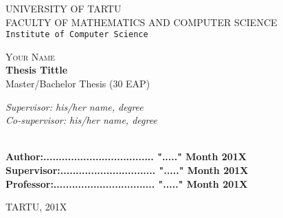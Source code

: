 \begin{titlepage}

\begin{center}



\textsc{UNIVERSITY OF TARTU}\\

\textsc{FACULTY OF MATHEMATICS AND COMPUTER SCIENCE}\\

\texttt{Institute of Computer Science}\\

\vspace{6 cm}


\textsc{ \large Your Name}\\[0.5cm]
{ \Huge \bfseries Thesis Tittle}\\[0.5cm]
{\large Master/Bachelor Thesis (30 EAP)}\\[3cm]



\begin{minipage}{0.8\textwidth}
\begin{flushright} \large
\emph{Supervisor: his/her name, degree}  \\	  %
\emph{Co-supervisor: his/her name, degree}  %
\end{flushright}
\end{minipage}

\textbf{}\\[1.0cm]

\textbf{Author:.................................... "....." Month   201X}\\[0.5cm]

\textbf{Supervisor:............................... "....." Month   201X}\\[0.5cm]

\textbf{Professor:................................. "....." Month   201X}\\[0.5cm]        

\vfill

{\large TARTU, 201X}

\end{center}

\end{titlepage}
